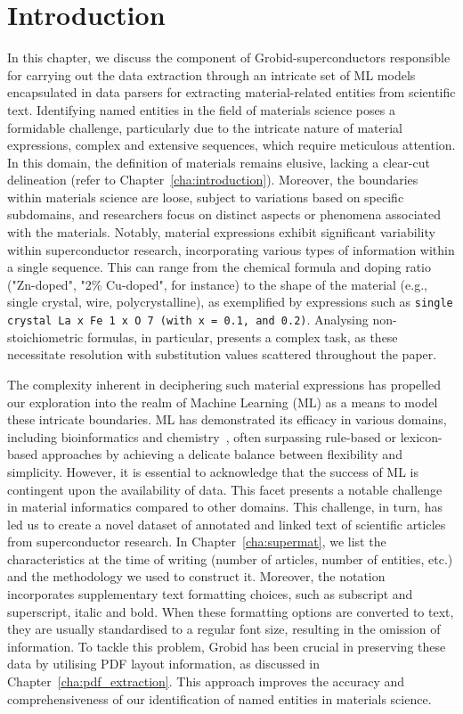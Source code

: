 \section{Introduction}
In this chapter, we discuss the component of Grobid-superconductors responsible for carrying out the data extraction through an intricate set of ML models encapsulated in data parsers for extracting material-related entities from scientific text. 
Identifying named entities in the field of materials science poses a formidable challenge, particularly due to the intricate nature of material expressions, complex and extensive sequences, which require meticulous attention. 
In this domain, the definition of materials remains elusive, lacking a clear-cut delineation (refer to Chapter~\ref{cha:introduction}). Moreover, the boundaries within materials science are loose, subject to variations based on specific subdomains, and researchers focus on distinct aspects or phenomena associated with the materials.
Notably, material expressions exhibit significant variability within superconductor research, incorporating various types of information within a single sequence. This can range from the chemical formula and doping ratio ("Zn-doped", "2\% Cu-doped", for instance) to the shape of the material (e.g., single crystal, wire, polycrystalline), as exemplified by expressions such as \texttt{single crystal La x Fe 1 x O 7 (with x = 0.1, and 0.2)}. Analysing non-stoichiometric formulas, in particular, presents a complex task, as these necessitate resolution with substitution values scattered throughout the paper.

The complexity inherent in deciphering such material expressions has propelled our exploration into the realm of Machine Learning (ML) as a means to model these intricate boundaries. ML has demonstrated its efficacy in various domains, including bioinformatics and chemistry~\cite{jiang2011astudy,tang2013recognizing,isazawa2022single}, often surpassing rule-based or lexicon-based approaches by achieving a delicate balance between flexibility and simplicity. 
However, it is essential to acknowledge that the success of ML is contingent upon the availability of data. This facet presents a notable challenge in material informatics compared to other domains. This challenge, in turn, has led us to create a novel dataset of annotated and linked text of scientific articles from superconductor research. In Chapter~\ref{cha:supermat}, we list the characteristics at the time of writing (number of articles, number of entities, etc.) and the methodology we used to construct it. 
Moreover, the notation incorporates supplementary text formatting choices, such as subscript and superscript, italic and bold. 
When these formatting options are converted to text, they are usually standardised to a regular font size, resulting in the omission of information.
To tackle this problem, Grobid has been crucial in preserving these data by utilising PDF layout information, as discussed in Chapter~\ref{cha:pdf_extraction}. This approach improves the accuracy and comprehensiveness of our identification of named entities in materials science.

